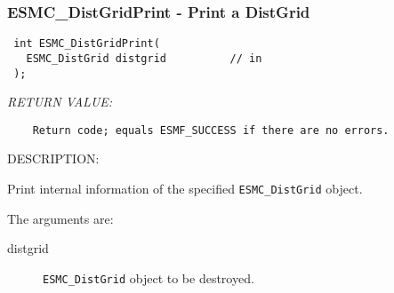 \subsubsection [ESMC\_DistGridPrint] {ESMC\_DistGridPrint - Print a DistGrid}


  
\begin{verbatim} int ESMC_DistGridPrint(
   ESMC_DistGrid distgrid          // in
 );\end{verbatim}{\em RETURN VALUE:}
\begin{verbatim}    Return code; equals ESMF_SUCCESS if there are no errors.\end{verbatim}
{\sf DESCRIPTION:\\ }


  
    Print internal information of the specified {\tt ESMC\_DistGrid} object.
  
    The arguments are:
    \begin{description}
    \item[distgrid] 
      {\tt ESMC\_DistGrid} object to be destroyed.
    \end{description}
  
\setlength{\parskip}{\oldparskip}
\setlength{\parindent}{\oldparindent}
\setlength{\baselineskip}{\oldbaselineskip}
